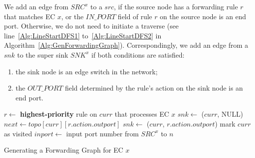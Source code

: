 We add an edge from $SRC^x$ to a $src$, if the source node has a forwarding rule $r$ that matches EC $x$, or the $IN\_PORT$ field of rule $r$ on the source node is an end port. 
Otherwise, we do not need to initiate a traverse (see line~\ref{Alg:LineStartDFS1} to~\ref{Alg:LineStartDFS2} in Algorithm~\ref{Alg:GenForwardingGraph}).
Correspondingly, we add an edge from a $snk$ to the super sink $SNK^x$ if both conditions are satisfied:
\begin{enumerate}
\item the sink node is an edge switch in the network;
\item the $OUT\_PORT$ field determined by the rule's action on the sink node is an end port.
\end{enumerate}

\begin{algorithm}[h]
\DontPrintSemicolon
{}
 {
         {
                $r \gets$ \textbf{highest-priority} rule on $curr$ that processes EC $x$\;
                 {\label{Alg:LineDropPath1}
                        $snk \gets$ ($curr$, NULL)\;
                        \;
                        \KwRet\;
                }\label{Alg:LineDropPath2}
                $next \gets topo[curr][r.action.outport]$\;
                 {\label{Alg:LineForwardPath1}
                        $snk \gets$ ($curr$, $r.action.outport$)\;
                        \;
                        \KwRet\;
                }\label{Alg:LineForwardPath2}
                mark $curr$ as visited\;
                \;
        }
}\;
 {\label{Alg:LineStartDFS1}
         {
                $inport \gets$ input port number from $SRC^x$ to $n$\;
                \;
        }
}\label{Alg:LineStartDFS2}
\caption{Generating a Forwarding Graph for EC $x$\label{Alg:GenForwardingGraph}}
\end{algorithm}


